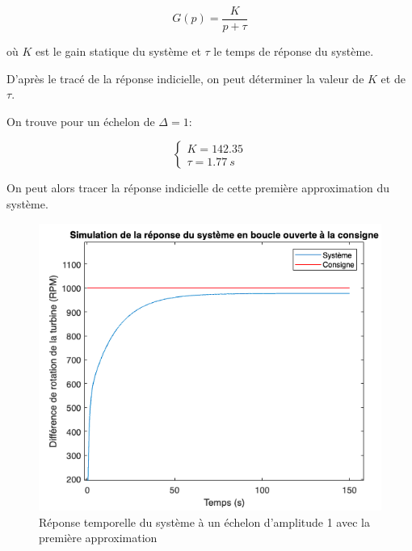 \documentclass[12pt]{report}
\begin{document}
\begin{equation}
  G(p) = \frac{K}{p + \tau}
\end{equation}
\vspace{0.5cm}

où $K$ est le gain statique du système et $\tau$ le temps de réponse du système.

D'après le tracé de la réponse indicielle, on peut déterminer la valeur de 
$K$ et de $\tau$.

On trouve pour un échelon de $\Delta = 1$: 

\begin{equation}
  \left\{
  \begin{matrix}
    K = 142.35 \\
    \tau = 1.77 ~ s
  \end{matrix}
  \right.
\end{equation}
\vspace{0.5cm}

On peut alors tracer la réponse indicielle de cette première approximation du système.

\newpage

\begin{figure}[!h]
  \vspace{0.5cm}
  \centering
  \includegraphics[scale=0.7]{fig/step_response_delta1_approximation.png}
  \caption{Réponse temporelle du système à un échelon d'amplitude 1 avec la première approximation}
\end{figure}
\end{document}
